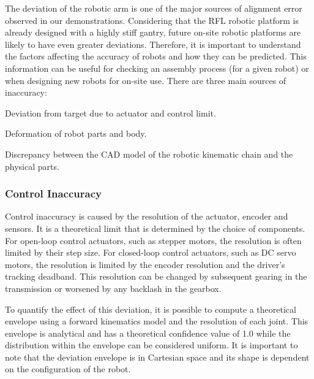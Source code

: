 The deviation of the robotic arm is one of the major sources of alignment error observed in our demonstrations. Considering that the RFL robotic platform is already designed with a highly stiff gantry, future on-site robotic platforms are likely to have even greater deviations. Therefore, it is important to understand the factors affecting the accuracy of robots and how they can be predicted. This information can be useful for checking an assembly process (for a given robot) or when designing new robots for on-site use. There are three main sources of inaccuracy:

\begin{description}[style=unboxed] %

	\item [Control Inaccuracy] Deviation from target due to actuator and control limit.

	\item [Mechanical Inaccuracy] Deformation of robot parts and body.

	\item [Forward Kinematics Inaccuracy] Discrepancy between the CAD model of the robotic kinematic chain and the physical parts. 

\end{description}

\subsubsection{Control Inaccuracy}
\label{subsubsection:new_hypo_control_inaccuracy}

Control inaccuracy is caused by the resolution of the actuator, encoder and sensors. It is a theoretical limit that is determined by the choice of components. For open-loop control actuators, such as stepper motors, the resolution is often limited by their step size. For closed-loop control actuators, such as DC servo motors, the resolution is limited by the encoder resolution and the driver's tracking deadband. This resolution can be changed by subsequent gearing in the transmission or worsened by any backlash in the gearbox. 

To quantify the effect of this deviation, it is possible to compute a theoretical envelope using a forward kinematics model and the resolution of each joint. This envelope is analytical and has a theoretical confidence value of 1.0 while the distribution within the envelope can be considered uniform. It is important to note that the deviation envelope is in Cartesian space and its shape is dependent on the configuration of the robot.

